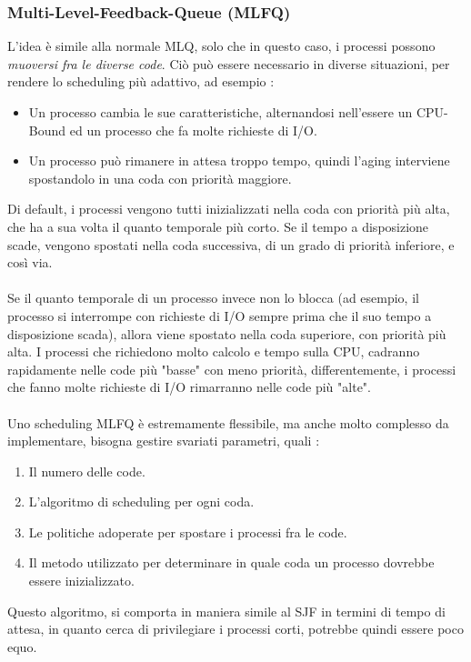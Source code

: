 \documentclass[12pt, letterpaper]{article}
\newcommand{\acc}{\\\hphantom{}\\}
\begin{document}
\subsubsection{Multi-Level-Feedback-Queue (MLFQ)}
L'idea è simile alla normale MLQ, solo che in questo caso, i processi possono \textit{muoversi fra 
le diverse code}. Ciò può essere necessario in diverse situazioni, per rendere lo scheduling più 
adattivo, ad esempio : \begin{itemize}
    \item Un processo cambia le sue caratteristiche, alternandosi nell'essere un CPU-Bound ed un processo che 
    fa molte richieste di I/O.
    \item Un processo può rimanere in attesa troppo tempo, quindi l'aging interviene spostandolo in una coda con 
    priorità maggiore.
\end{itemize}
Di default, i processi vengono tutti inizializzati nella coda con priorità più alta, che ha a sua volta il 
quanto temporale più corto. Se il tempo a disposizione scade, vengono spostati nella coda successiva, di un grado 
di priorità inferiore, e così via. \acc Se il quanto temporale di un processo invece non lo blocca (ad esempio, il processo 
si interrompe con richieste di I/O sempre prima che il suo tempo a disposizione scada), allora viene spostato 
nella coda superiore, con priorità più alta. I processi che richiedono molto calcolo e tempo sulla CPU, cadranno rapidamente 
nelle code più "basse" con meno priorità, differentemente, i processi che fanno molte richieste di I/O 
rimarranno nelle code più "alte".\acc 
Uno scheduling MLFQ è estremamente flessibile, ma anche molto complesso da implementare, bisogna gestire svariati 
parametri, quali : \begin{enumerate}
    \item Il numero delle code.
    \item L'algoritmo di scheduling per ogni coda. 
    \item Le politiche adoperate per spostare i processi fra le code. 
    \item Il metodo utilizzato per determinare in quale coda un processo dovrebbe essere inizializzato.
\end{enumerate}
Questo algoritmo, si comporta in maniera simile al SJF in termini di tempo di attesa, in quanto cerca di privilegiare i 
processi corti, potrebbe quindi essere poco equo.
\end{document}
